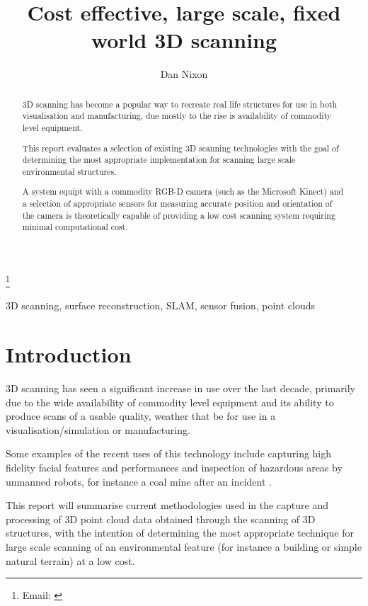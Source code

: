 \documentclass{entcs}
\begin{document}
\begin{frontmatter}
  \title{Cost effective, large scale, fixed world 3D scanning}
  \author{Dan Nixon}
  \address{School of Computing Science, Newcastle University, UK}
  \thanks[email]{Email:
    \href{mailto:d.nixon2@ncl.ac.uk}
  {\texttt{}}}

  \begin{abstract}
    3D scanning has become a popular way to recreate real life structures for
    use in both visualisation and manufacturing, due mostly to the rise is
    availability of commodity level equipment.

    This report evaluates a selection of existing 3D scanning technologies with
    the goal of determining the most appropriate implementation for scanning
    large scale environmental structures.

    A system equipt with a commodity RGB-D camera (such as the Microsoft Kinect)
    and a selection of appropriate sensors for measuring accurate position and
    orientation of the camera is theoretically capable of providing a low cost
    scanning system requiring minimal computational cost.
  \end{abstract}

  \begin{keyword}
    3D scanning, surface reconstruction, SLAM, sensor fusion, point clouds
  \end{keyword}
\end{frontmatter}

\section{Introduction}

3D scanning has seen a significant increase in use over the last decade,
primarily due to the wide availability of commodity level equipment and its
ability to produce scans of a usable quality, weather that be for use in a
visualisation/simulation or manufacturing.

Some examples of the recent uses of this technology include capturing high
fidelity facial features and performances \cite{Huang2011} and inspection of
hazardous areas by unmanned robots, for instance a coal mine after an incident
\cite{Kot2016}.

This report will summarise current methodologies used in the capture and
processing of 3D point cloud data obtained through the scanning of 3D
structures, with the intention of determining the most appropriate technique for
large scale scanning of an environmental feature (for instance a building or
simple natural terrain) at a low cost.
\end{document}
